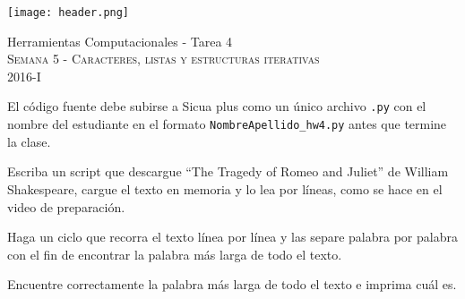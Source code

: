 \documentclass[11pt,letterpaper]{exam}
\begin{document}
\begin{center}

\texttt{[image: header.png]}

\vspace{1.0cm}
{\Large Herramientas Computacionales - Tarea 4} \\
\textsc{Semana 5 - Caracteres, listas y estructuras iterativas}\\
2016-I\\
\end{center}



\vspace{0.5cm}

\noindent
El c\'odigo fuente debe subirse a Sicua plus como un \'unico archivo
\verb".py" con el nombre del estudiante en el formato \verb"NombreApellido_hw4.py" antes que termine la clase.

\vspace{0.5cm}

\begin{questions}
 

Escriba un script que descargue ``The Tragedy of Romeo and Juliet'' de William Shakespeare, cargue el texto en memoria y lo lea por l\'ineas, como se hace en el video de preparaci\'on.


Haga un ciclo que recorra el texto l\'inea por l\'inea y las separe palabra por palabra con el fin de encontrar la palabra m\'as larga de todo el texto. 


Encuentre correctamente la palabra m\'as larga de todo el texto e imprima cu\'al es.


\end{questions}
\end{document}
